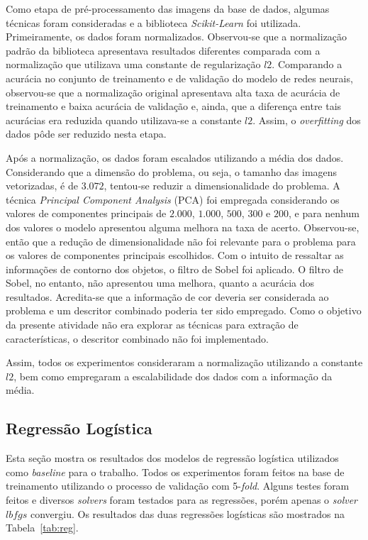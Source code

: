 \documentclass[conference]{IEEEtran}
\begin{document}
Como etapa de pré-processamento das imagens da base de dados, algumas técnicas foram consideradas e a biblioteca \emph{Scikit-Learn} foi utilizada. Primeiramente, os dados foram normalizados. Observou-se que a normalização padrão da biblioteca apresentava resultados diferentes comparada com a normalização que utilizava uma constante de regularização $l2$. Comparando a acurácia no conjunto de treinamento e de validação do modelo de redes neurais, observou-se que a normalização original apresentava alta taxa de acurácia de treinamento e baixa acurácia de validação e, ainda, que a diferença entre tais acurácias era reduzida quando utilizava-se a constante $l2$. Assim, o \emph{overfitting} dos dados pôde ser reduzido nesta etapa.

Após a normalização, os dados foram escalados utilizando a média dos dados. Considerando que a dimensão do problema, ou seja, o tamanho das imagens vetorizadas, é de $3.072$, tentou-se reduzir a dimensionalidade do problema.  A técnica \emph{Principal Component Analysis} (PCA) foi empregada considerando os valores de componentes principais de $2.000$, $1.000$, $500$, $300$ e $200$, e para nenhum dos valores o modelo apresentou alguma melhora na taxa de acerto. Observou-se, então que a redução de dimensionalidade não foi relevante para o problema para os valores de componentes principais escolhidos. Com o intuito de ressaltar as informações de contorno dos objetos, o filtro de Sobel foi aplicado. O filtro de Sobel, no entanto, não apresentou uma melhora, quanto a acurácia dos resultados. Acredita-se que a informação de cor deveria ser considerada ao problema e um descritor combinado poderia ter sido empregado. Como o objetivo da presente atividade não era explorar as técnicas para extração de características, o descritor combinado não foi implementado.

Assim, todos os experimentos consideraram a normalização utilizando a constante $l2$, bem como empregaram a escalabilidade dos dados com a informação da média.


\subsection{Regressão Logística}

Esta seção mostra os resultados dos modelos de regressão logística utilizados como \emph{baseline} para o trabalho. Todos os experimentos foram feitos na base de treinamento utilizando o processo de validação com 5-\emph{fold}. Alguns testes foram feitos e diversos \emph{solvers} foram testados para as regressões, porém apenas o \emph{solver} $lbfgs$ convergiu. Os resultados das duas regressões logísticas são mostrados na Tabela~\ref{tab:reg}.
\end{document}
